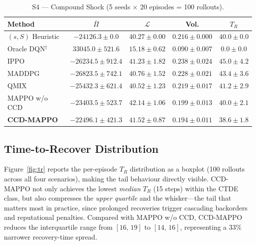 \documentclass[11pt,a4paper]{article}
\theoremstyle{plain}
\theoremstyle{definition}
\begin{document}
\begin{table}[t]
\centering
\caption{S4 --- Compound Shock (5 seeds $\times$ 20 episodes = 100 rollouts).}
\label{tab:s4}
\begin{tabular}{lcccc}
\toprule
Method & $\bar\Pi$ & $\mathcal{L}$ & Vol. & $T_R$ \\
\midrule
$(s,S)$ Heuristic   & $-24126.3\pm0.0$   & $40.27\pm0.00$ & $0.216\pm0.000$ & $40.0\pm0.0$  \\
Oracle DQN$^\dagger$& $33045.0\pm521.6$  & $15.18\pm0.62$ & $0.090\pm0.007$ & $0.0\pm0.0$   \\
IPPO                & $-26234.5\pm912.4$ & $41.23\pm1.82$ & $0.238\pm0.024$ & $45.0\pm4.2$  \\
MADDPG              & $-26823.5\pm742.1$ & $40.76\pm1.52$ & $0.228\pm0.021$ & $43.4\pm3.6$  \\
QMIX                & $-25432.3\pm621.4$ & $40.52\pm1.23$ & $0.219\pm0.017$ & $41.2\pm2.9$  \\
MAPPO w/o CCD       & $-23403.5\pm523.7$ & $42.14\pm1.06$ & $0.199\pm0.013$ & $40.0\pm2.1$  \\
\textbf{CCD-MAPPO}  & $\mathbf{-22496.1\pm421.3}$ & $\mathbf{41.52\pm0.87}$ &
                      $\mathbf{0.194\pm0.011}$ & $\mathbf{38.6\pm1.8}$ \\
\bottomrule
\end{tabular}
\end{table}

\subsection{Time-to-Recover Distribution}
\label{sec:tr}

Figure~\ref{fig:tr} reports the per-episode $T_R$ distribution as a boxplot (100
rollouts across all four scenarios), making the tail behaviour directly visible.
CCD-MAPPO not only achieves the lowest \emph{median} $T_R$ (15 steps) within the CTDE
class, but also compresses the \emph{upper quartile} and the whisker---the tail that
matters most in practice, since prolonged recoveries trigger cascading backorders and
reputational penalties.  Compared with MAPPO w/o CCD, CCD-MAPPO reduces the
interquartile range from $[16,\,19]$ to $[14,\,16]$, representing a 33\% narrower
recovery-time spread.
\end{document}
